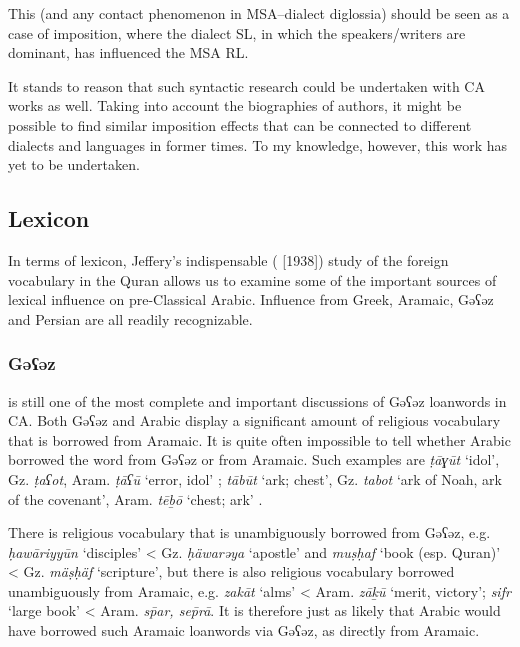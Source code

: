 \documentclass[output=paper]{langsci/langscibook}
\begin{document}
This (and any contact phenomenon in MSA–dialect diglossia) should be seen as a case of imposition, where the dialect SL, in which the speakers/writers are dominant, has influenced the MSA RL. 

It stands to reason that such syntactic research could be undertaken with CA works as well. Taking into account the biographies of authors, it might be possible to find similar imposition effects that can be connected to different dialects and languages in former times. To my knowledge, however, this work has yet to be undertaken.

\subsection{Lexicon}

In terms of lexicon, Jeffery’s indispensable (\citeyear{Jeffrey2007} [1938]) study of the foreign vocabulary in the Quran allows us to examine some of the important sources of lexical influence on pre-Classical Arabic. Influence from Greek, Aramaic, Gəʕəz and Persian are all readily recognizable. 

\subsubsection{\label{bkm:Ref13224677}Gəʕəz}

\citet{Nöldeke1910} is still one of the most complete and important discussions of Gəʕəz loanwords in CA. Both Gəʕəz and Arabic display a significant amount of religious vocabulary that is borrowed from Aramaic. It is quite often impossible to tell whether Arabic borrowed the word from Gəʕəz or from Aramaic. Such examples are \textit{ṭāɣūt} ‘idol’, Gz. \textit{ṭaʕot}, Aram. \textit{ṭāʕū} ‘error, idol’ \citep[48]{Nöldeke1910}; \textit{tābūt} ‘ark; chest’, Gz. \textit{tabot} ‘ark of Noah, ark of the covenant’, Aram. \textit{tēḇō} ‘chest; ark’ \citep[49]{Nöldeke1910}.

There is religious vocabulary that is unambiguously borrowed from Gəʕəz, e.g. \textit{ḥawāriyyūn} ‘disciples’ < Gz. \textit{ḥäwarəya} ‘apostle’ and \textit{muṣḥaf} ‘book (esp. Quran)’ < Gz. \textit{mäṣḥäf} ‘scripture’, but there is also religious vocabulary borrowed unambiguously from Aramaic, e.g. \textit{zakāt} ‘alms’ < Aram. \textit{zāḵū} ‘merit, victory’; \textit{sifr} ‘large book’ < Aram. \textit{sp̄ar, sep̄rā}. It is therefore just as likely that Arabic would have borrowed such Aramaic loanwords via Gəʕəz, as directly from Aramaic.
\end{document}
